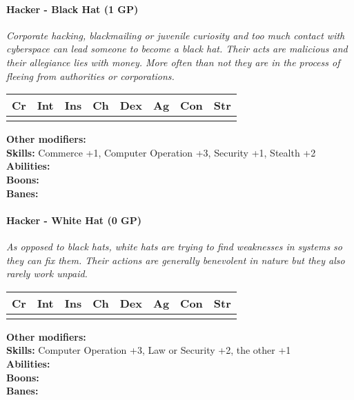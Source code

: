 \hrulefill
\paragraph*{Hacker - Black Hat (1 GP)}
\textit{Corporate hacking, blackmailing or juvenile curiosity and too much contact with cyberspace can lead someone to become a black hat. Their acts are malicious and their allegiance lies with money. More often than not they are in the process of fleeing from authorities or corporations.}\par
\begin{tabular}{|l|l|l|l|l|l|l|l|}
	\hline
	Cr & Int & Ins & Ch & Dex & Ag & Con & Str \\ \hline
	&  &  &  &  &  &  &  \\ \hline
\end{tabular}\par
\noindent\textbf{Other modifiers:} \\
\textbf{Skills:} Commerce +1,
Computer Operation +3,
Security +1,
Stealth +2\\
\textbf{Abilities:} \\
\textbf{Boons:} \\
\textbf{Banes:} \\

\hrulefill
\paragraph*{Hacker - White Hat (0 GP)}
\textit{As opposed to black hats, white hats are trying to find weaknesses in systems so they can fix them. Their actions are generally benevolent in nature but they also rarely work unpaid.}\par
\begin{tabular}{|l|l|l|l|l|l|l|l|}
	\hline
	Cr & Int & Ins & Ch & Dex & Ag & Con & Str \\ \hline
	&  &  &  &  &  &  &  \\ \hline
\end{tabular}\par
\noindent\textbf{Other modifiers:} \\
\textbf{Skills:} Computer Operation +3,
Law or Security +2,
the other +1\\
\textbf{Abilities:} \\
\textbf{Boons:} \\
\textbf{Banes:} \\

\hrulefill
